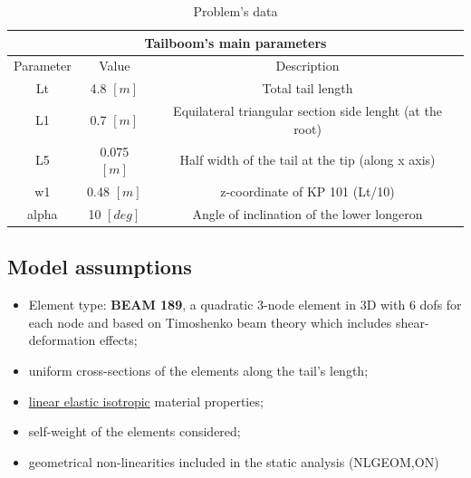  \bigskip
 \begin{table}[h!]
 	\centering
 	
 	\begin{tabular}{c c c} 
 		\toprule
 		\multicolumn{3}{c}{Tailboom's main parameters}\\
 		\midrule
 		Parameter & Value & Description \\
 		\midrule
 		Lt & 4.8 $[m]$  & Total tail length \\
 		L1 & 0.7 $[m]$  & Equilateral triangular section side lenght (at the root) \\ 
 		L5 & 0.075 $[m]$  & Half width of the tail at the tip (along x axis) \\ 
 		w1 & 0.48 $[m]$ & z-coordinate of KP 101 (Lt/10) \\  
 		alpha &  10 $[deg]$ & Angle of inclination of the lower longeron \\

 		\bottomrule
 	\end{tabular}
 	\caption{Problem's data}
 	
 \end{table}

\clearpage
\subsection*{Model assumptions}

\noindent
\begin{quoting}
	\begin{itemize}
		
		\item Element type: \textbf{BEAM 189}, a quadratic 3-node element in 3D with 6 dofs for each node and based on Timoshenko beam theory which includes shear-deformation effects;
		
		\item uniform cross-sections of the elements along the tail's length;
		
		\item \underline{linear elastic isotropic} material properties;
		
		\item self-weight of the elements considered;
		
		\item geometrical non-linearities included in the static analysis (NLGEOM,ON) \\
		
	\end{itemize}
\end{quoting}

